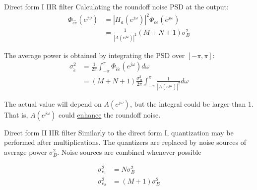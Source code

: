 \documentclass[10pt]{beamer}
\begin{document}
\begin{frame}{Direct form I IIR filter}
	Calculating the roundoff noise PSD at the output:
	\begin{align*}
	\Phi_{\tilde{e}\tilde{e}}(e^{j\omega}) &= |H_a(e^{j\omega})|^2\Phi_{ee}(e^{j\omega}) \\
	& = \frac{1}{|A(e^{j\omega})|^2}(M+N+1)\sigma_B^2
	\end{align*}
	
	The average power is obtained by integrating the PSD over $[-\pi, \pi]$:
	\begin{align*}
	\sigma_{\tilde{e}}^2 &=\frac{1}{2\pi}\int_{-\pi}^{\pi}\Phi_{\tilde{e}\tilde{e}}(e^{j\omega})d\omega \\
	&=(M+N+1)\frac{\sigma_B^2}{2\pi}\int_{-\pi}^{\pi} \frac{1}{|A(e^{j\omega})|^2}d\omega
	\end{align*}
	
	The actual value will depend on $A(e^{j\omega})$, but the integral could be larger than 1. That is, $A(e^{j\omega})$ could \underline{enhance} the roundoff noise.
	
\end{frame}

%
\begin{frame}{Direct form II IIR filter}
 Similarly to the direct form I, quantization may be performed after multiplications. The quantizers are replaced by noise sources of average power $\sigma_B^2$. Noise sources are combined whenever possible
 
\begin{align*}
\sigma_{e_1}^2 &= N\sigma_B^2 \tag{average power of $e_1[n]$} \\
\sigma_{e_2}^2 &= (M+1)\sigma_B^2 \tag{average power of $e_2[n]$} \\
\end{align*}
 
\begin{center}
	\resizebox{0.7\textwidth}{!}{}
\end{center}

\end{frame}
\end{document}

